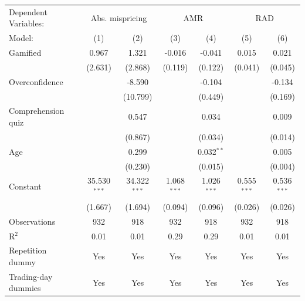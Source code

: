 \begin{tabular}{lcccccc}
   \tabularnewline \midrule \midrule
   Dependent Variables: & \multicolumn{2}{c}{Abs. mispricing} & \multicolumn{2}{c}{AMR} & \multicolumn{2}{c}{RAD}\\
   Model:              & (1)            & (2)            & (3)           & (4)           & (5)           & (6)\\  
   \midrule
   Gamified            & 0.967          & 1.321          & -0.016        & -0.041        & 0.015         & 0.021\\   
                       & (2.631)        & (2.868)        & (0.119)       & (0.122)       & (0.041)       & (0.045)\\   
   Overconfidence      &                & -8.590         &               & -0.104        &               & -0.134\\   
                       &                & (10.799)       &               & (0.449)       &               & (0.169)\\   
   Comprehension quiz  &                & 0.547          &               & 0.034         &               & 0.009\\   
                       &                & (0.867)        &               & (0.034)       &               & (0.014)\\   
   Age                 &                & 0.299          &               & 0.032$^{**}$  &               & 0.005\\   
                       &                & (0.230)        &               & (0.015)       &               & (0.004)\\   
   Constant            & 35.530$^{***}$ & 34.322$^{***}$ & 1.068$^{***}$ & 1.026$^{***}$ & 0.555$^{***}$ & 0.536$^{***}$\\   
                       & (1.667)        & (1.694)        & (0.094)       & (0.096)       & (0.026)       & (0.026)\\   
   \midrule
   Observations        & 932            & 918            & 932           & 918           & 932           & 918\\  
   R$^2$               & 0.01           & 0.01           & 0.29          & 0.29          & 0.01          & 0.01\\  
   Repetition dummy    & Yes            & Yes            & Yes           & Yes           & Yes           & Yes\\  
   Trading-day dummies & Yes            & Yes            & Yes           & Yes           & Yes           & Yes\\  
   \midrule \midrule
\end{tabular}
